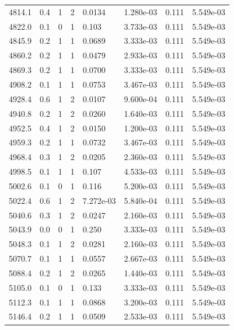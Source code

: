 \documentclass[preview]{standalone}
\begin{document}
{{{{{{{{\begin{tabular}{L{1.2cm}C{1.2cm} C{0.3cm}C{0.5cm} C{1.4cm}C{1.4cm} C{1.4cm}C{1.4cm}}
  4814.1  &   0.4  & 1     &  2 &  0.0134  & 1.280e-03  & 0.111 &  5.549e-03   \\ 
  4822.0  &   0.1  & 0     &  1 &  0.103  & 3.733e-03  & 0.111 &  5.549e-03   \\ 
  4845.9  &   0.2  & 1     &  1 &  0.0689  & 3.333e-03  & 0.111 &  5.549e-03   \\ 
  4860.2  &   0.2  & 1     &  1 &  0.0479  & 2.933e-03  & 0.111 &  5.549e-03   \\ 
  4869.3  &   0.2  & 1     &  1 &  0.0700  & 3.333e-03  & 0.111 &  5.549e-03   \\ 
  4908.2  &   0.1  & 1     &  1 &  0.0753  & 3.467e-03  & 0.111 &  5.549e-03   \\ 
  4928.4  &   0.6  & 1     &  2 &  0.0107  & 9.600e-04  & 0.111 &  5.549e-03   \\ 
  4940.8  &   0.2  & 1     &  2 &  0.0260  & 1.640e-03  & 0.111 &  5.549e-03   \\ 
  4952.5  &   0.4  & 1     &  2 &  0.0150  & 1.200e-03  & 0.111 &  5.549e-03   \\ 
  4959.3  &   0.2  & 1     &  1 &  0.0732  & 3.467e-03  & 0.111 &  5.549e-03   \\ 
  4968.4  &   0.3  & 1     &  2 &  0.0205  & 2.360e-03  & 0.111 &  5.549e-03   \\ 
  4998.5  &   0.1  & 1     &  1 &  0.107  & 4.533e-03  & 0.111 &  5.549e-03   \\ 
  5002.6  &   0.1  & 0     &  1 &  0.116  & 5.200e-03  & 0.111 &  5.549e-03   \\ 
  5022.4  &   0.6  & 1     &  2 &  7.272e-03  & 5.840e-04  & 0.111 &  5.549e-03   \\ 
  5040.6  &   0.3  & 1     &  2 &  0.0247  & 2.160e-03  & 0.111 &  5.549e-03   \\ 
  5043.9  &   0.0  & 0     &  1 &  0.250  & 3.333e-03  & 0.111 &  5.549e-03   \\ 
  5048.3  &   0.1  & 1     &  2 &  0.0281  & 2.160e-03  & 0.111 &  5.549e-03   \\ 
  5070.7  &   0.1  & 1     &  1 &  0.0557  & 2.667e-03  & 0.111 &  5.549e-03   \\ 
  5088.4  &   0.2  & 1     &  2 &  0.0265  & 1.440e-03  & 0.111 &  5.549e-03   \\ 
  5105.0  &   0.1  & 0     &  1 &  0.133  & 3.333e-03  & 0.111 &  5.549e-03   \\ 
  5112.3  &   0.1  & 1     &  1 &  0.0868  & 3.200e-03  & 0.111 &  5.549e-03   \\ 
  5146.4  &   0.2  & 1     &  1 &  0.0509  & 2.533e-03  & 0.111 &  5.549e-03   \\ 

\end{tabular}}}}}}}}}
\end{document}
